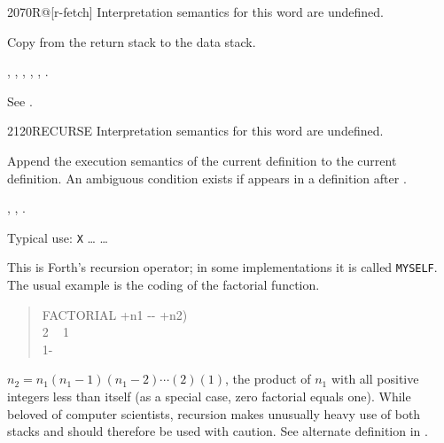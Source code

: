 \begin{worddef}{2070}{R@}[r-fetch]
\interpret
	Interpretation semantics for this word are undefined.

\execute

	Copy  from the return stack to the data stack.

\see {},
	,
	,
	,
	,
	.

	\begin{testing} %
		See .
	\end{testing}
\end{worddef}


\begin{worddef}{2120}{RECURSE}
\interpret
	Interpretation semantics for this word are undefined.

\compile
	\stack{}{}

	Append the execution semantics of the current definition to
	the current definition. An ambiguous condition exists if
	 appears in a definition after .

\see {},
	,
	.

	\begin{rationale} %
		Typical use:
			\word{:} \texttt{X} {\ldots}  {\ldots} \word{;}

		This is Forth's recursion operator; in some implementations it
		is called \texttt{MYSELF}. The usual example is the coding of
		the factorial function.

		\begin{quote}\ttfamily
		\word{:} FACTORIAL  +n1 -{}- +n2) \\
		\tab {} 2  ~
				 1 ~
			 \\
		\tab {} 1- ~~ \word{*} \\
		\word{;}
		\end{quote}

		$n_2 = n_1(n_1-1)(n_1-2)\cdots(2)(1)$, the product of $n_1$
		with all positive integers less than itself (as a special case,
		zero factorial equals one). While beloved of computer scientists,
		recursion makes unusually heavy use of both stacks and should
		therefore be used with caution. See alternate definition in
		.
	\end{rationale}


\end{worddef}
